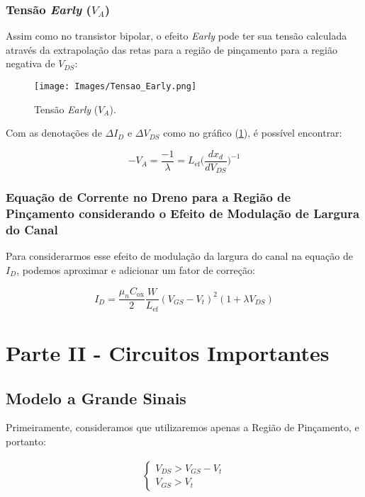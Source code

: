\documentclass[12pt]{article}
\begin{document}
\subsubsection{Tensão \textit{Early} ($V_A$)}

Assim como no transistor bipolar, o efeito \textit{Early} pode ter sua tensão calculada através da extrapolação das retas para a região de pinçamento para a região negativa de $V_{DS}$:

\begin{figure}[H]
  \begin{center}
    \texttt{[image: Images/Tensao\_Early.png]}
  \end{center}
  \caption{Tensão \textit{Early} ($V_A$).}
  \label{fig:tensao_early}
\end{figure}

Com as denotações de $\Delta I_D$ e $\Delta V_{DS}$ como no gráfico (\ref{fig:tensao_early}), é possível encontrar:

$$
  -V_A = \frac{-1}{\lambda} = L_{\text{ef}} \Big ( \frac{dx_d}{dV_{DS}} \Big )^{-1}
$$

\subsubsection{Equação de Corrente no Dreno para a Região de Pinçamento considerando o Efeito de Modulação de Largura do Canal}

Para considerarmos esse efeito de modulação da largura do canal na equação de $I_D$, podemos aproximar e adicionar um fator de correção:

$$
  I_D = \frac{\mu_n C_{\text{ox}}}{2} \frac{W}{L_{\text{ef}}} (V_{GS} - V_t)^2 (1 + \lambda V_{DS})
$$

\section{Parte II - Circuitos Importantes}

\subsection{Modelo a Grande Sinais}

Primeiramente, consideramos que utilizaremos apenas a Região de Pinçamento, e portanto:

\begin{align*}
  \begin{cases}
    V_{DS} > V_{GS} - V_t \\
    V_{GS} > V_t
  \end{cases}
\end{align*}
\end{document}
